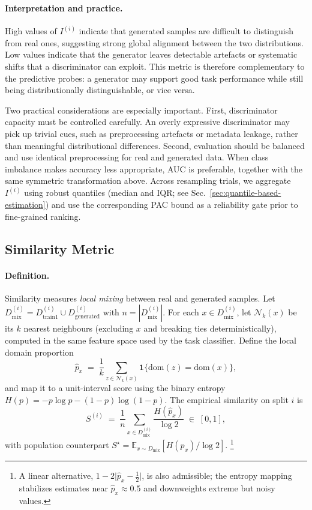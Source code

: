\paragraph{Interpretation and practice.}
High values of $I^{(i)}$ indicate that generated samples are difficult to
distinguish from real ones, suggesting strong global alignment between the two
distributions. Low values indicate that the generator leaves detectable
artefacts or systematic shifts that a discriminator can exploit. This metric is
therefore complementary to the predictive probes: a generator may support good
task performance while still being distributionally distinguishable, or vice
versa.

Two practical considerations are especially important. First, discriminator
capacity must be controlled carefully. An overly expressive discriminator may
pick up trivial cues, such as preprocessing artefacts or metadata leakage,
rather than meaningful distributional differences. Second, evaluation should be
balanced and use identical preprocessing for real and generated data. When
class imbalance makes accuracy less appropriate, AUC is preferable, together
with the same symmetric transformation above. Across resampling trials, we
aggregate $I^{(i)}$ using robust quantiles (median and IQR; see
Sec.~\ref{sec:quantile-based-estimation}) and use the corresponding PAC bound
as a reliability gate prior to fine-grained ranking.


\subsection{Similarity Metric}
\label{sec:similarity}

\paragraph{Definition.}
Similarity measures \emph{local mixing} between real and generated samples.
Let $D_{\mathrm{mix}}^{(i)}=D_{\mathrm{train1}}^{(i)} \cup D_{\mathrm{generated}}^{(i)}$
with $n=|D_{\mathrm{mix}}^{(i)}|$.
For each $x\in D_{\mathrm{mix}}^{(i)}$, let $\mathcal N_k(x)$ be its $k$
nearest neighbours (excluding $x$ and breaking ties deterministically),
computed in the same feature space used by the task classifier.
Define the local domain proportion
\[
\hat p_x \;=\; \frac{1}{k}\sum_{z\in \mathcal N_k(x)}
\mathbf{1}\{\mathrm{dom}(z)=\mathrm{dom}(x)\},
\]
and map it to a unit-interval score using the binary entropy
$H(p)=-p\log p-(1-p)\log(1-p)$. The empirical similarity on split $i$ is
\[
S^{(i)} \;=\;
\frac{1}{n}\sum_{x\in D_{\mathrm{mix}}^{(i)}}
\frac{H(\hat p_x)}{\log 2}
\;\in\; [0,1],
\]
with population counterpart
$S^\star=\mathbb E_{x\sim D_{\mathrm{mix}}}[H(p_x)/\log 2]$.
\footnote{A linear alternative, $1-2\lvert \hat p_x-\tfrac12\rvert$, is also
admissible; the entropy mapping stabilizes estimates near
$\hat p_x\!\approx\!0.5$ and downweights extreme but noisy values.}

